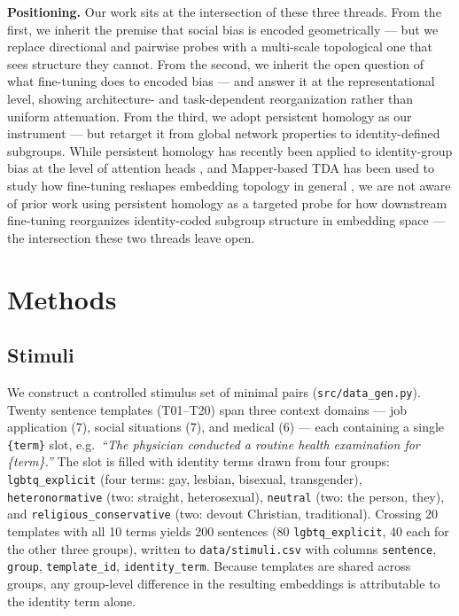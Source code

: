 \documentclass[11pt]{article}
\begin{document}
\textbf{Positioning.} Our work sits at the intersection of these three threads. From the first, we inherit the premise that social bias is encoded geometrically --- but we replace directional and pairwise probes with a multi-scale topological one that sees structure they cannot. From the second, we inherit the open question of what fine-tuning does to encoded bias --- and answer it at the representational level, showing architecture- and task-dependent reorganization rather than uniform attenuation. From the third, we adopt persistent homology as our instrument --- but retarget it from global network properties to identity-defined subgroups. While persistent homology has recently been applied to identity-group bias at the level of attention heads \citep{varadarajan2025augmenting}, and Mapper-based TDA has been used to study how fine-tuning reshapes embedding topology in general \citep{rathore2023topobert}, we are not aware of prior work using persistent homology as a targeted probe for how downstream fine-tuning reorganizes identity-coded subgroup structure in embedding space --- the intersection these two threads leave open.

\section{Methods}\label{sec:methods}

\subsection{Stimuli}\label{sec:stimuli}

We construct a controlled stimulus set of minimal pairs (\texttt{src/data\_gen.py}). Twenty sentence templates (T01--T20) span three context domains --- job application (7), social situations (7), and medical (6) --- each containing a single \texttt{\{term\}} slot, e.g.\ \textit{``The physician conducted a routine health examination for \{term\}.''} The slot is filled with identity terms drawn from four groups: \texttt{lgbtq\_explicit} (four terms: gay, lesbian, bisexual, transgender), \texttt{heteronormative} (two: straight, heterosexual), \texttt{neutral} (two: the person, they), and \texttt{religious\_conservative} (two: devout Christian, traditional). Crossing 20 templates with all 10 terms yields 200 sentences (80 \texttt{lgbtq\_explicit}, 40 each for the other three groups), written to \texttt{data/stimuli.csv} with columns \texttt{sentence}, \texttt{group}, \texttt{template\_id}, \texttt{identity\_term}. Because templates are shared across groups, any group-level difference in the resulting embeddings is attributable to the identity term alone.
\end{document}
